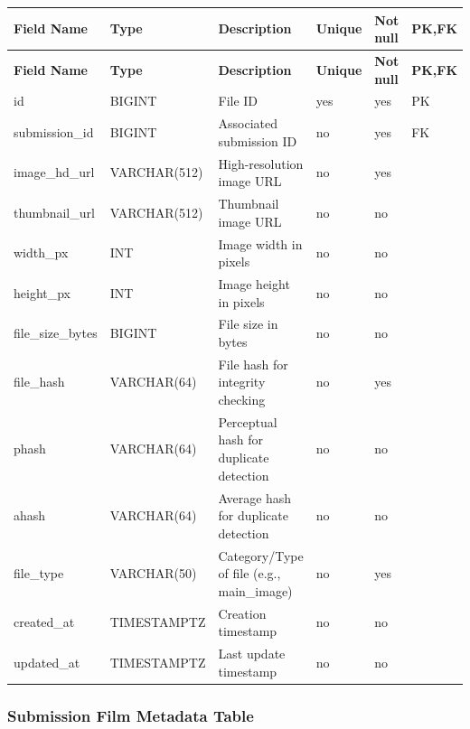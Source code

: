 \vspace{0.5em}
\renewcommand{\arraystretch}{1.15}
\setlength{\tabcolsep}{4pt}
\small
\begin{longtable}{|>{\raggedright\arraybackslash}p{}|>{\raggedright\arraybackslash}p{}|>{\raggedright\arraybackslash}p{}|>{\centering\arraybackslash}p{}|>{\centering\arraybackslash}p{}|>{\centering\arraybackslash}p{}|}
\hline
\textbf{Field Name} & \textbf{Type} & \textbf{Description} & \textbf{Unique} & \textbf{Not null} & \textbf{PK,FK} \\
\hline
\endfirsthead
\textbf{Field Name} & \textbf{Type} & \textbf{Description} & \textbf{Unique} & \textbf{Not null} & \textbf{PK,FK} \\
\hline
\endhead
id & BIGINT & File ID & yes & yes & PK \\
\hline
submission\_id & BIGINT & Associated submission ID & no & yes & FK \\
\hline
image\_hd\_url & VARCHAR(512) & High-resolution image URL & no & yes & \\
\hline
thumbnail\_url & VARCHAR(512) & Thumbnail image URL & no & no & \\
\hline
width\_px & INT & Image width in pixels & no & no & \\
\hline
height\_px & INT & Image height in pixels & no & no & \\
\hline
file\_size\_bytes & BIGINT & File size in bytes & no & no & \\
\hline
file\_hash & VARCHAR(64) & File hash for integrity checking & no & yes & \\
\hline
phash & VARCHAR(64) & Perceptual hash for duplicate detection & no & no & \\
\hline
ahash & VARCHAR(64) & Average hash for duplicate detection & no & no & \\
\hline
file\_type & VARCHAR(50) & Category/Type of file (e.g., main\_image) & no & yes & \\
\hline
created\_at & TIMESTAMPTZ & Creation timestamp & no & no & \\
\hline
updated\_at & TIMESTAMPTZ & Last update timestamp & no & no & \\
\hline
\end{longtable}

\vspace{1em}
\subsubsection{Submission Film Metadata Table}
\label{subsubsec:submission-film-metadata-table}

